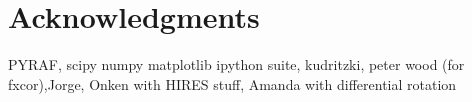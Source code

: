 \section{Acknowledgments}
\label{sec:acknowledgments}
PYRAF, scipy numpy matplotlib ipython suite, kudritzki, peter wood (for fxcor),Jorge, Onken with HIRES stuff, Amanda with differential rotation


%
%
%
